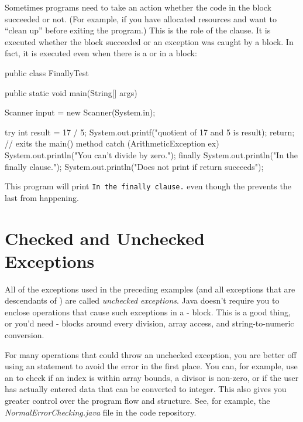 Sometimes programs need to take an action whether the code in the  block succeeded or not. (For example, if you have allocated resources and want to ``clean up'' before exiting the program.) This is the role of the  clause. It is executed whether the  block succeeded or an exception was caught by a  block. In fact, it is executed even when there is a  or  in a block:

\begin{code}
public class FinallyTest {

    public static void main(String[] args) {
        Scanner input = new Scanner(System.in);
        
        try {
            int result = 17 / 5;
            System.out.printf("quotient of 17 and 5 is %
               result);
            return; // exits the main() method
        }
        catch (ArithmeticException ex) {
            System.out.println("You can't divide by zero.");
        }
        finally {
            System.out.println("In the finally clause.");
        }
        System.out.println("Does not print if return succeeds");
    }
}
\end{code}

This program will print {\tt In the finally clause.} even though the  prevents the last  from happening.

\section{Checked and Unchecked Exceptions}

All of the exceptions used in the preceding examples (and all exceptions that are descendants of ) are called {\em unchecked exceptions}. Java doesn't require you to enclose operations that cause such exceptions in a - block. This is a good thing, or you'd need - blocks around every division, array access, and string-to-numeric conversion.

For many operations that could throw an unchecked exception, you are better off using an  statement to avoid the error in the first place. You can, for example, use an  to check if an index is within array bounds, a divisor is non-zero, or if the user has actually entered data that can be converted to integer. This also gives you greater control over the program flow and structure. See, for example, the {\it NormalErrorChecking.java} file in the code repository.

